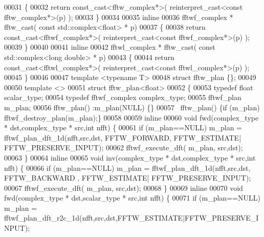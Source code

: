 \begin{DoxyCode}
00031   \{
00032       \textcolor{keywordflow}{return} \textcolor{keyword}{const\_cast<}fftw\_complex*\textcolor{keyword}{>}( \textcolor{keyword}{reinterpret\_cast<}\textcolor{keyword}{const }fftw\_complex*\textcolor{keyword}{>}(p) ); 
00033   \}
00034 
00035   \textcolor{keyword}{inline} 
00036   fftwf\_complex * fftw\_cast( \textcolor{keyword}{const} std::complex<float> * p)
00037   \{ 
00038       \textcolor{keywordflow}{return} \textcolor{keyword}{const\_cast<}fftwf\_complex*\textcolor{keyword}{>}( \textcolor{keyword}{reinterpret\_cast<}\textcolor{keyword}{const }fftwf\_complex*\textcolor{keyword}{>}(p) ); 
00039   \}
00040 
00041   \textcolor{keyword}{inline} 
00042   fftwl\_complex * fftw\_cast( \textcolor{keyword}{const} std::complex<long double> * p)
00043   \{ 
00044       \textcolor{keywordflow}{return} \textcolor{keyword}{const\_cast<}fftwl\_complex*\textcolor{keyword}{>}( \textcolor{keyword}{reinterpret\_cast<}\textcolor{keyword}{const }fftwl\_complex*\textcolor{keyword}{>}(p) ); 
00045   \}
00046 
00047   \textcolor{keyword}{template} <\textcolor{keyword}{typename} T> 
00048   \textcolor{keyword}{struct }fftw\_plan \{\};
00049 
00050   \textcolor{keyword}{template} <> 
00051   \textcolor{keyword}{struct }fftw\_plan<float>
00052   \{
00053       \textcolor{keyword}{typedef} \textcolor{keywordtype}{float} scalar\_type;
00054       \textcolor{keyword}{typedef} fftwf\_complex complex\_type;
00055       fftwf\_plan m\_plan;
00056       fftw\_plan() :m\_plan(NULL) \{\}
00057       ~fftw\_plan() \{\textcolor{keywordflow}{if} (m\_plan) fftwf\_destroy\_plan(m\_plan);\}
00058 
00059       \textcolor{keyword}{inline}
00060       \textcolor{keywordtype}{void} fwd(complex\_type * dst,complex\_type * src,\textcolor{keywordtype}{int} nfft) \{
00061           \textcolor{keywordflow}{if} (m\_plan==NULL) m\_plan = fftwf\_plan\_dft\_1d(nfft,src,dst, FFTW\_FORWARD, FFTW\_ESTIMATE|
      FFTW\_PRESERVE\_INPUT);
00062           fftwf\_execute\_dft( m\_plan, src,dst);
00063       \}
00064       \textcolor{keyword}{inline}
00065       \textcolor{keywordtype}{void} inv(complex\_type * dst,complex\_type * src,\textcolor{keywordtype}{int} nfft) \{
00066           \textcolor{keywordflow}{if} (m\_plan==NULL) m\_plan = fftwf\_plan\_dft\_1d(nfft,src,dst, FFTW\_BACKWARD , FFTW\_ESTIMATE|
      FFTW\_PRESERVE\_INPUT);
00067           fftwf\_execute\_dft( m\_plan, src,dst);
00068       \}
00069       \textcolor{keyword}{inline}
00070       \textcolor{keywordtype}{void} fwd(complex\_type * dst,scalar\_type * src,\textcolor{keywordtype}{int} nfft) \{
00071           \textcolor{keywordflow}{if} (m\_plan==NULL) m\_plan = fftwf\_plan\_dft\_r2c\_1d(nfft,src,dst,FFTW\_ESTIMATE|FFTW\_PRESERVE\_INPUT);

\end{DoxyCode}
